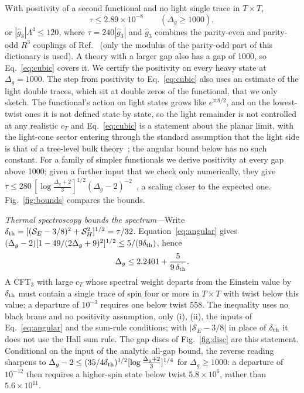 \documentclass[aps,prl,twocolumn,superscriptaddress,nofootinbib,floatfix]{revtex4-2}
\begin{document}
With positivity of a second functional and no light single trace in $T\times T$,
\begin{equation}
\tau\le2.89\times10^{-8}\qquad(\Delta_g\ge1000),
\label{eq:cubic}
\end{equation}
or $|\hat g_3|\Lambda^4\le120$, where $\tau=240|\hat g_3|$ and $\hat g_3$ combines the parity-even and parity-odd $R^3$
couplings of Ref.~\cite{CHLPS} (only the modulus of the parity-odd part of this dictionary is used). A theory with a larger gap
also has a gap of 1000, so Eq.~\eqref{eq:cubic} covers it. We certify the positivity on every heavy state at $\Delta_g=1000$.
The step from positivity to Eq.~\eqref{eq:cubic} also uses an estimate of the light double traces, which sit at double zeros of
the functional, that we only sketch. The functional's action on light states grows like $e^{\pi\Lambda/2}$, and on the lowest-twist ones it is not defined state by state, so the light remainder is not controlled at any realistic $c_T$ and Eq.~\eqref{eq:cubic} is a statement about the planar limit, with the light-cone sector entering through the standard assumption that the light side is that of a tree-level bulk theory~\cite{CHMRS}; the angular bound below has no such constant. For a family of simpler functionals we derive positivity at every gap above 1000; given a further input that we check only
numerically, they give $\tau\le280\,[\log\frac{\Delta_g+2}3]^{1/2}(\Delta_g-2)^{-2}$~\cite{SM}, a scaling closer to the expected one.
Fig.~\ref{fig:bounds} compares the bounds.

\textit{Thermal spectroscopy bounds the spectrum}---Write $\delta_{\rm th}=[(\mathcal S_E-3/8)^2+\mathcal S_H^2]^{1/2}=\tau/32$.
Equation~\eqref{eq:angular} gives $(\Delta_g-2)[1-49/(2\Delta_g+9)^2]^{1/2}\le5/(9\delta_{\rm th})$, hence
\begin{equation}
\Delta_g\le2.2401+\frac5{9\,\delta_{\rm th}}.
\label{eq:gapthm}
\end{equation}
A CFT$_3$ with large $c_T$ whose spectral weight departs from the Einstein value by $\delta_{\rm th}$ must contain a single trace of
spin four or more in $T\times T$ with twist below this value; a departure of $10^{-3}$ requires one below twist 558. The inequality
uses no black brane and no positivity assumption, only (i), (ii), the inputs of Eq.~\eqref{eq:angular} and the sum-rule
conditions; with $|\mathcal S_E-3/8|$ in place of $\delta_{\rm th}$ it does not use the Hall sum rule. The gap discs of
Fig.~\ref{fig:disc} are this statement. Conditional on the input of the analytic all-gap bound, the reverse reading sharpens to
$\Delta_g-2\le(35/4\delta_{\rm th})^{1/2}[\log\frac{\Delta_g+2}3]^{1/4}$ for $\Delta_g\ge1000$: a departure of $10^{-12}$ then requires
a higher-spin state below twist $5.8\times10^{6}$, rather than $5.6\times10^{11}$.
\end{document}
